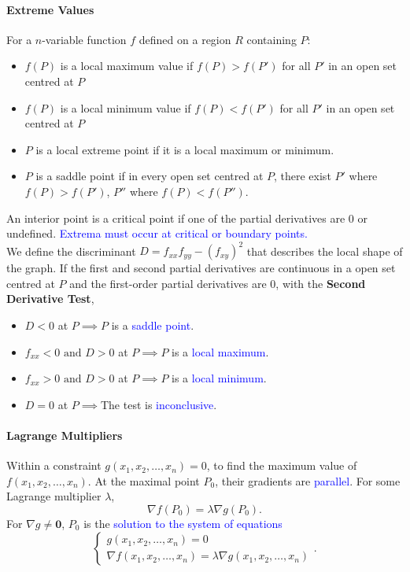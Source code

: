 \paragraph{Extreme Values}
For a $n$-variable function $f$ defined on a region $R$ containing $P$:
\begin{itemize}
  \item $f\left( P \right) $ is a \textcolor{Bittersweet}{local maximum value}
    if $f(P)>f(P')$ for all $P'$ in an open set centred at $P$
  \item $f\left( P \right) $ is a \textcolor{Bittersweet}{local minimum value}
    if $f(P)<f(P')$ for all $P'$ in an open set centred at $P$
  \item $P$ is a \textcolor{Bittersweet}{local extreme point} if it is a local
    maximum or minimum.
  \item $P$ is a \textcolor{Bittersweet}{saddle point} if in every open set
    centred at $P$, there exist $P'$ where $f\left( P \right) >f\left( P'
    \right) $, $P''$ where $f\left( P \right) <f\left( P'' \right) $.
\end{itemize}
An interior point is a \textcolor{Bittersweet}{critical point} if one of the
partial derivatives are $0$ or undefined.  \textcolor{Blue}{Extrema must occur
at critical or boundary points.}\\
We define the \textcolor{Bittersweet}{discriminant} $D=f_{xx}f_{yy}-{\left(
f_{xy} \right)}^{2}$ that describes the local shape of the graph. If the first
and second partial derivatives are continuous in a open set centred at $P$ and
the first-order partial derivatives are $0$, with the \textbf{Second Derivative
Test},
\begin{itemize}
  \item $D<0$ at $P\implies P$ is a \textcolor{Blue}{saddle point}.
  \item $f_{xx}<0\text{ and }D>0$ at $P\implies P$ is a \textcolor{Blue}{local maximum}.
  \item $f_{xx}>0\text{ and }D>0$ at $P\implies P$ is a \textcolor{Blue}{local minimum}.
  \item $D=0$ at $P\implies$The test is \textcolor{Blue}{inconclusive}.
\end{itemize}

\paragraph{Lagrange Multipliers}
Within a constraint $g\left( x_1,x_2,\ldots,x_{n} \right) =0$, to find the
maximum value of $f\left( x_1,x_2,\ldots,x_{n} \right) $. At the maximal point
$P_0$, their gradients are \textcolor{Blue}{parallel}. For some
\textcolor{Bittersweet}{Lagrange multiplier} $\lambda$,
\[\nabla f\left( P_0 \right) =\lambda\nabla g\left( P_0 \right).\]
For $\nabla g\neq \mathbf{0}$,
$P_0$ is the \textcolor{Blue}{solution to the system of equations}
\[\begin{cases}g\left( x_1,x_2,\ldots,x_{n} \right) =0\\\nabla f\left( x_1,x_2,\ldots,x_{n} \right) =\lambda\nabla g\left( x_1,x_2,\ldots,x_{n} \right) \end{cases}.\]

